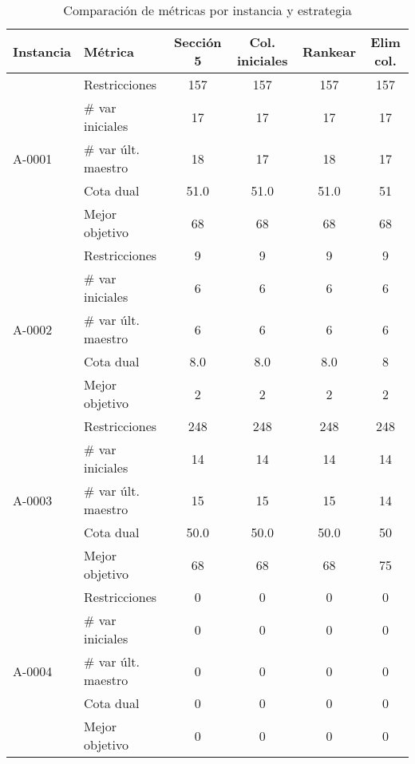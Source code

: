 \documentclass[a4paper,12pt]{article}
\begin{document}
\begin{table}[h!]
\centering
\renewcommand{\arraystretch}{1.2}
\begin{tabular}{llcccc}
\toprule
\textbf{Instancia} & \textbf{Métrica} & \textbf{Sección 5} & \textbf{Col. iniciales} & \textbf{Rankear} & \textbf{Elim col.} \\
\midrule
\multirow{5}{*}{A-0001} 
  & Restricciones         & 157 & 157 & 157 & 157 \\
  & \# var iniciales      & 17  & 17  & 17  & 17  \\
  & \# var últ. maestro   & 18  & 17  & 18  & 17  \\
  & Cota dual             & 51.0& 51.0& 51.0& 51  \\
  & Mejor objetivo        & 68  & 68  & 68  & 68  \\
\midrule
\multirow{5}{*}{A-0002} 
  & Restricciones         & 9   & 9   & 9   & 9   \\
  & \# var iniciales      & 6   & 6   & 6   & 6   \\
  & \# var últ. maestro   & 6   & 6   & 6   & 6   \\
  & Cota dual             & 8.0 & 8.0 & 8.0 & 8   \\
  & Mejor objetivo        & 2   & 2   & 2   & 2   \\
\midrule
\multirow{5}{*}{A-0003} 
  & Restricciones         & 248 & 248 & 248 & 248 \\
  & \# var iniciales      & 14  & 14  & 14  & 14  \\
  & \# var últ. maestro   & 15  & 15  & 15  & 14  \\
  & Cota dual             & 50.0& 50.0& 50.0& 50  \\
  & Mejor objetivo        & 68  & 68  & 68  & 75  \\
\midrule
\multirow{5}{*}{A-0004} 
  & Restricciones         & 0   & 0   & 0   & 0   \\
  & \# var iniciales      & 0   & 0   & 0   & 0   \\
  & \# var últ. maestro   & 0   & 0   & 0   & 0   \\
  & Cota dual             & 0   & 0   & 0   & 0   \\
  & Mejor objetivo        & 0   & 0   & 0   & 0   \\
\bottomrule
\end{tabular}
\caption{Comparación de métricas por instancia y estrategia}
\end{table}

\clearpage
\end{document}
